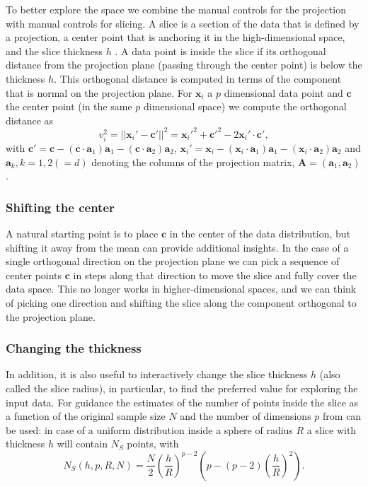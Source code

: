 \documentclass[]{interact}
\theoremstyle{plain}%
\theoremstyle{definition}
\theoremstyle{remark}
\begin{document}
To better explore the space we combine the manual controls for the
projection with manual controls for slicing. A slice is a section of the
data that is defined by a projection, a center point that is anchoring
it in the high-dimensional space, and the slice thickness \(h\)
\citep{slicetour}. A data point is inside the slice if its orthogonal
distance from the projection plane (passing through the center point) is
below the thickness \(h\). This orthogonal distance is computed in terms
of the component that is normal on the projection plane. For
\(\mathbf{x}_i\) a \(p\) dimensional data point and \(\mathbf{c}\) the
center point (in the same \(p\) dimensional space) we compute the
orthogonal distance as \begin{equation}
v_i^2 = ||\mathbf{x}_i' - \mathbf{c}'||^2 = \mathbf{x}_i'^2 + \mathbf{c}'^2 - 2 \mathbf{x}_i'\cdot\mathbf{c}' ,
\label{eq:slice}
\end{equation} with
\(\mathbf{c}' = \mathbf{c} - (\mathbf{c}\cdot \mathbf{a}_1) \mathbf{a}_1 - (\mathbf{c}\cdot \mathbf{a}_2 )\mathbf{a}_2\),
\(\mathbf{x}_i' = \mathbf{x}_i - (\mathbf{x}_i\cdot \mathbf{a}_1) \mathbf{a}_1 - (\mathbf{x}_i\cdot \mathbf{a}_2) \mathbf{a}_2\)
and \(\mathbf{a}_k, k=1,2 (=d)\) denoting the columns of the projection
matrix, \(\mathbf{A}=(\mathbf{a}_1, \mathbf{a}_2)\).

\hypertarget{shifting-the-center}{%
\subsubsection{Shifting the center}\label{shifting-the-center}}

A natural starting point is to place \(\mathbf{c}\) in the center of the
data distribution, but shifting it away from the mean can provide
additional insights. In the case of a single orthogonal direction on the
projection plane we can pick a sequence of center points \(\mathbf{c}\)
in steps along that direction to move the slice and fully cover the data
space. This no longer works in higher-dimensional spaces, and we can
think of picking one direction and shifting the slice along the
component orthogonal to the projection plane.

\hypertarget{changing-the-thickness}{%
\subsubsection{Changing the thickness}\label{changing-the-thickness}}

In addition, it is also useful to interactively change the slice
thickness \(h\) (also called the slice radius), in particular, to find
the preferred value for exploring the input data. For guidance the
estimates of the number of points inside the slice as a function of the
original sample size \(N\) and the number of dimensions \(p\) from
\citet{sectionpursuit} can be used: in case of a uniform distribution
inside a sphere of radius \(R\) a slice with thickness \(h\) will
contain \(N_S\) points, with \begin{equation}
N_S(h, p, R, N) = \frac{N}{2} \left(\frac{h}{R}\right)^{p-2} \left(p - (p-2)\left(\frac{h}{R}\right)^{2}\right).
\label{eq:count}
\end{equation}
\end{document}
